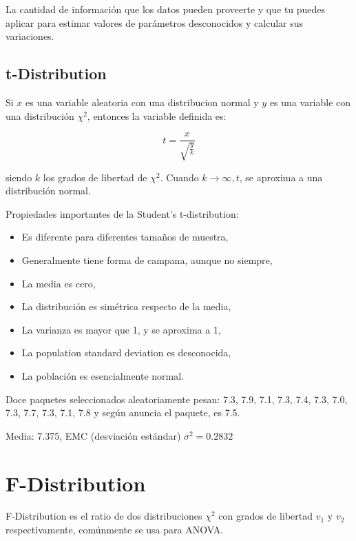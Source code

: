 \documentclass[oneside]{book}
\begin{document}
La cantidad de información que los datos pueden proveerte y que tu puedes aplicar para estimar valores de parámetros desconocidos y calcular sus variaciones.

\subsection{t-Distribution}

Si $x$ es una variable aleatoria con una distribucion normal y $y$ es una variable con una distribución $\chi^2$, entonces la variable definida es:

\begin{equation}
 t = \frac{x}{\sqrt{\frac{y}{k}}}
\end{equation}

siendo $k$ los grados de libertad de $\chi^2$. Cuando $k \longrightarrow \infty, t$, se aproxima a una distribución normal.

Propiedades importantes de la Student's t-distribution:
\begin{itemize}
	\item Es diferente para diferentes tamaños de muestra,
	\item Generalmente tiene forma de campana, aunque no siempre,
	\item La media es cero,
	\item La distribución es simétrica respecto de la media,
	\item La varianza es mayor que 1, y se aproxima a 1,
	\item La population standard deviation es desconocida,
	\item La población es esencialmente normal.
\end{itemize}

Doce paquetes seleccionados aleatoriamente pesan: 7.3, 7.9, 7.1, 7.3, 7.4, 7.3, 7.0, 7.3, 7.7, 7.3, 7.1, 7.8 y según anuncia el paquete, es 7.5. 

Media: 7.375, EMC (desviación estándar) $\sigma^2 = 0.2832$

\section{F-Distribution}

F-Distribution es el ratio de dos distribuciones $\chi^2$ con grados de libertad $v_1$ y $v_2$ respectivamente, comúnmente se usa para ANOVA.
\end{document}
